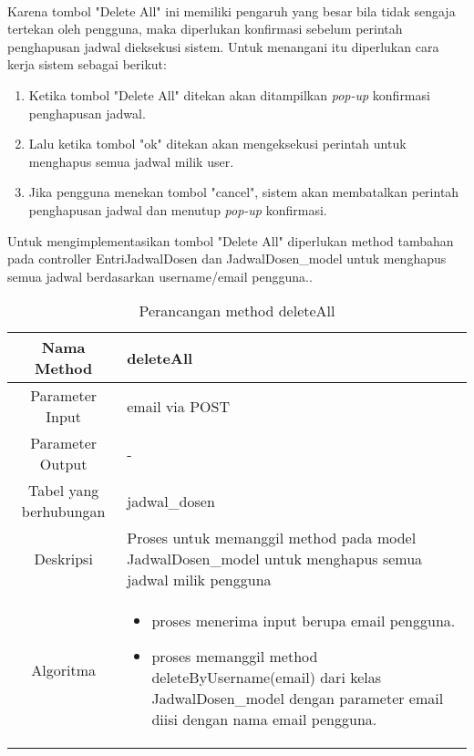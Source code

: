\paragraph{}Karena tombol "Delete All" ini memiliki pengaruh yang besar bila tidak sengaja tertekan oleh pengguna, maka diperlukan konfirmasi sebelum perintah penghapusan jadwal dieksekusi sistem.\newline
Untuk menangani itu diperlukan cara kerja sistem sebagai berikut:
\begin{enumerate}
	\item Ketika tombol "Delete All" ditekan akan ditampilkan \textit{pop-up} konfirmasi penghapusan jadwal.
	\item Lalu ketika tombol "ok" ditekan akan mengeksekusi perintah untuk menghapus semua jadwal milik user.
	\item Jika pengguna menekan tombol "cancel", sistem akan membatalkan perintah penghapusan jadwal dan menutup \textit{pop-up} konfirmasi.
\end{enumerate}
Untuk mengimplementasikan tombol "Delete All" diperlukan method tambahan pada controller EntriJadwalDosen dan JadwalDosen\_model untuk menghapus semua jadwal berdasarkan username/email pengguna..
\begin{center}
\begin{table}[H]
\begin{tabular}{|c|p{11cm}|}
\hline
Nama Method 	& 	deleteAll 	\\
\hline
Parameter Input & email via POST \\
\hline
Parameter Output & - \\
\hline
Tabel yang berhubungan & jadwal\_dosen \\
\hline
Deskripsi	& Proses untuk memanggil method pada model JadwalDosen\_model untuk menghapus semua jadwal milik pengguna \\
\hline
Algoritma	& \begin{itemize}
				\item proses menerima input berupa email pengguna.
				\item proses memanggil method deleteByUsername(email) dari kelas JadwalDosen\_model dengan parameter email diisi dengan nama email pengguna.
				\end{itemize} \\
\hline
\end{tabular}
\caption{Perancangan method deleteAll}
\end{table}
\end{center}

